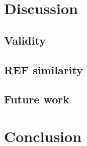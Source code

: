 \documentclass[a4paper,oneside]{memoir}
\begin{document}
\chapter{Discussion}
  \section{Validity}
  \section{REF similarity}
  \section{Future work}

\chapter{Conclusion}

\end{document}

